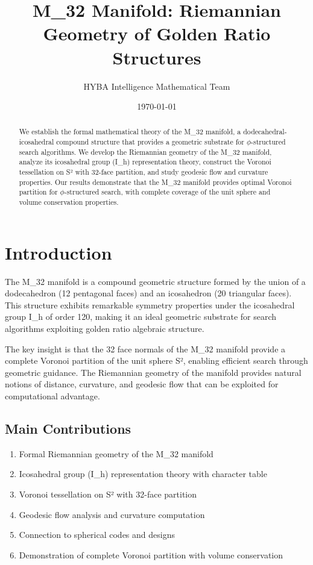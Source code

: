 \documentclass{article}
\title{M_32 Manifold: Riemannian Geometry of Golden Ratio Structures}
\author{HYBA Intelligence Mathematical Team}
\date{\today}
\theoremstyle{remark}
\begin{document}
\maketitle

\begin{abstract}
We establish the formal mathematical theory of the M_32 manifold, a dodecahedral-icosahedral compound structure that provides a geometric substrate for $\phi$-structured search algorithms. We develop the Riemannian geometry of the M_32 manifold, analyze its icosahedral group (I_h) representation theory, construct the Voronoi tessellation on S² with 32-face partition, and study geodesic flow and curvature properties. Our results demonstrate that the M_32 manifold provides optimal Voronoi partition for $\phi$-structured search, with complete coverage of the unit sphere and volume conservation properties.
\end{abstract}

\section{Introduction}

The M_32 manifold is a compound geometric structure formed by the union of a dodecahedron (12 pentagonal faces) and an icosahedron (20 triangular faces). This structure exhibits remarkable symmetry properties under the icosahedral group I_h of order 120, making it an ideal geometric substrate for search algorithms exploiting golden ratio algebraic structure.

The key insight is that the 32 face normals of the M_32 manifold provide a complete Voronoi partition of the unit sphere S², enabling efficient search through geometric guidance. The Riemannian geometry of the manifold provides natural notions of distance, curvature, and geodesic flow that can be exploited for computational advantage.

\subsection{Main Contributions}

\begin{enumerate}
\item Formal Riemannian geometry of the M_32 manifold
\item Icosahedral group (I_h) representation theory with character table
\item Voronoi tessellation on S² with 32-face partition
\item Geodesic flow analysis and curvature computation
\item Connection to spherical codes and designs
\item Demonstration of complete Voronoi partition with volume conservation
\end{enumerate}
\end{document}
